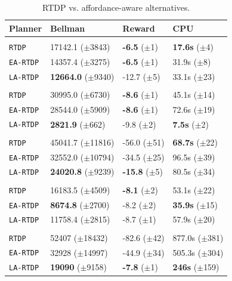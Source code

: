 \documentclass[letterpaper]{article}
\newcommand{\ra}[1]{\renewcommand{\arraystretch}{#1}} %
\begin{document}
\begin{table}
\ra{1.15}
\small
\begin{tabular}{@{}llll@{}}\toprule
Planner & Bellman & Reward & CPU \\ \midrule
&\hspace{-10mm}{\it Mining Task} \\
\texttt{RTDP} & 17142.1 ($\pm$3843) 		& {\bf -6.5} ($\pm$1)  & {\bf 17.6s}   ($\pm$4) \\
\texttt{EA-RTDP} 	& 14357.4 ($\pm$3275) 		& {\bf -6.5}   ($\pm$1) & 31.9s   ($\pm$8) \\
\texttt{LA-RTDP} 	& {\bf 12664.0} ($\pm$9340) 	& -12.7 ($\pm$5) & 33.1s   ($\pm$23) \\\hline
&\hspace{-10mm}{\it Smelting Task} \\
\texttt{RTDP} 	& 30995.0 ($\pm$6730) 		& {\bf -8.6}   ($\pm$1) & 45.1s   ($\pm$14) \\
\texttt{EA-RTDP} 	& 28544.0 ($\pm$5909) 		& {\bf -8.6}   ($\pm$1) & 72.6s   ($\pm$19) \\ 
\texttt{LA-RTDP} 	& {\bf 2821.9} 	 ($\pm$662) 	& -9.8   ($\pm$2) & {\bf 7.5s}  ($\pm$2) \\ \hline
&\hspace{-10mm}{\it Wall Traversal Task} \\
\texttt{RTDP} & 45041.7 ($\pm$11816) 		& -56.0   ($\pm$51) & {\bf 68.7s}   ($\pm$22) \\
\texttt{EA-RTDP} 	& 32552.0 ($\pm$10794) 		& -34.5   ($\pm$25) & 96.5s   ($\pm$39) \\ 
\texttt{LA-RTDP} 	& {\bf 24020.8} ($\pm$9239) 	& {\bf -15.8}   ($\pm$5) & 80.5s   ($\pm$34) \\ \hline
&\hspace{-10mm}{\it Trench Traversal Task} \\
\texttt{RTDP}  	& 16183.5 ($\pm$4509) 		& {\bf -8.1}   ($\pm$2) & 53.1s   ($\pm$22) \\
\texttt{EA-RTDP} 	& {\bf 8674.8} 	($\pm$2700) 	& -8.2   ($\pm$2) & {\bf 35.9s}   ($\pm$15) \\ 
\texttt{LA-RTDP} 	& 11758.4 ($\pm$2815) 		& -8.7   ($\pm$1) & 57.9s   ($\pm$20) \\ \hline
&\hspace{-10mm}{\it Plane Traversal Task} \\
\texttt{RTDP} & 52407 ($\pm$18432) 		& -82.6   ($\pm$42) & 877.0s   ($\pm$381) \\
\texttt{EA-RTDP} 	& 32928 ($\pm$14997) 		& -44.9   ($\pm$34) & 505.3s   ($\pm$304) \\
\texttt{LA-RTDP} 	& {\bf 19090} 	 ($\pm$9158) 	& {\bf-7.8}   ($\pm$1) & {\bf 246s}  ($\pm$159) \\
\bottomrule
\end{tabular}
\caption{RTDP vs. affordance-aware alternatives.}
\label{table:minecraft_results}
\end{table}
\end{document}
